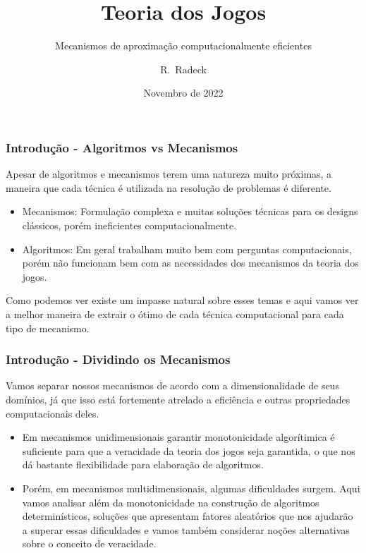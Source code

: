 \documentclass{beamer}
\title[MC758] %
{Teoria dos Jogos}
\subtitle{Mecanismos de aproximação computacionalmente eficientes}
\author[Radeck] %
{R.~Radeck}
\institute[IC] %
{
  Instituto de Computação\\
  Universidade estadual de Campinas
}
\date[] %
{Novembro de 2022}
\begin{document}
\frame{\titlepage}

\begin{frame}
    \frametitle{Introdução - Algoritmos vs Mecanismos}
    Apesar de algoritmos e mecanismos terem uma natureza muito próximas, a maneira que cada técnica é utilizada na resolução de problemas é diferente. %

    \begin{itemize}
        \item{Mecanismos: Formulação complexa e muitas soluções técnicas para os designs clássicos, porém ineficientes computacionalmente.} %

        \item{Algoritmos: Em geral trabalham muito bem com perguntas computacionais, porém não funcionam bem com as necessidades dos mecanismos da teoria dos jogos.} %
    \end{itemize}
    
    Como podemos ver existe um impasse natural sobre esses temas e aqui vamos ver a melhor maneira de extrair o ótimo de cada técnica computacional para cada tipo de mecanismo.
\end{frame}

\begin{frame}
    \frametitle{Introdução - Dividindo os Mecanismos}
    Vamos separar nossos mecanismos de acordo com a dimensionalidade de seus domínios, já que isso está fortemente atrelado a eficiência e outras propriedades computacionais deles. %

    \begin{itemize}
        \item{Em mecanismos unidimensionais garantir monotonicidade algorítimica é suficiente para que a veracidade da teoria dos jogos seja garantida, o que nos dá bastante flexibilidade para elaboração de algoritmos.} %
        \item{Porém, em mecanismos multidimensionais, algumas dificuldades surgem. Aqui vamos analisar além da monotonicidade na construção de algoritmos determinísticos, soluções que apresentam fatores aleatórios que nos ajudarão a superar essas dificuldades e vamos também considerar noções alternativas sobre o conceito de veracidade.}
    \end{itemize}
        
\end{frame}
\end{document}
